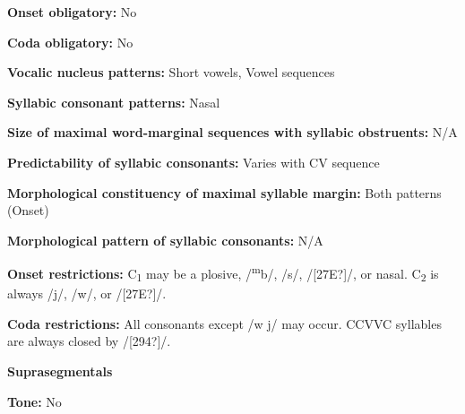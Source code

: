\begin{styleBody}
\textbf{Onset obligatory:} No
\end{styleBody}

\begin{styleBody}
\textbf{Coda obligatory:} No
\end{styleBody}

\begin{styleBody}
\textbf{Vocalic nucleus patterns:} Short vowels, Vowel sequences
\end{styleBody}

\begin{styleBody}
\textbf{Syllabic consonant patterns:} Nasal
\end{styleBody}

\begin{styleBody}
\textbf{Size of maximal word{}-marginal sequences with syllabic obstruents:} N/A
\end{styleBody}

\begin{styleBody}
\textbf{Predictability of syllabic consonants:} Varies with CV sequence
\end{styleBody}

\begin{styleBody}
\textbf{Morphological constituency of maximal syllable margin:} Both patterns (Onset)
\end{styleBody}

\begin{styleBody}
\textbf{Morphological pattern of syllabic consonants:} N/A
\end{styleBody}

\begin{styleBody}
\textbf{Onset restrictions: }C\textsubscript{1} may be a plosive, /\textsuperscript{m}b/, /s/, /[27E?]/, or nasal. C\textsubscript{2} is always /j/, /w/, or /[27E?]/.
\end{styleBody}

\begin{styleBody}
\textbf{Coda restrictions: }All consonants except /w j/ may occur. CCVVC syllables are always closed by /[294?]/.
\end{styleBody}

\begin{styleBody}
\textbf{Suprasegmentals}
\end{styleBody}

\begin{styleBody}
\textbf{Tone:} No
\end{styleBody}

